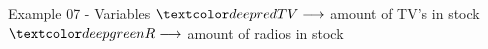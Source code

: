 \begin{frame}{Example 07 - Variables}
\LARGE{
$\colora{TV} \longrightarrow$
    amount of TV's in stock \\ \vspace{1cm}
$\colorb{R}  \longrightarrow$
    amount of radios in stock
}
\end{frame}
